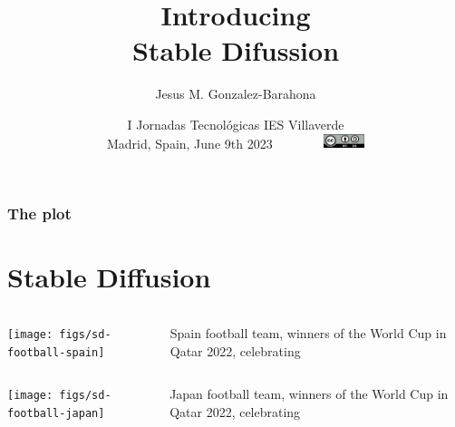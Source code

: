 \documentclass[17pt,aspectratio=169,hyperref={pdfusetitle,colorlinks,allcolors=olive}]{beamer}
\title[Stable Diffusion]{Introducing  \\ Stable Difussion}
\author[Jesus M. Gonzalez-Barahona]{Jesus M. Gonzalez-Barahona}
\institute[URJC]{Universidad Rey Juan Carlos \\
  \url{https://floss.social/@jgbarah} ~~~~~ \url{https://jgbarah.github.io/presentations}}
\date[Jornadas Cultura Libre, 2023]{\small I Jornadas Tecnológicas IES Villaverde \\
  Madrid, Spain, June 9th 2023~~~~~~~~\includegraphics[width=1.2cm]{figs/by-sa}}
\begin{document}
\begin{frame}
  \maketitle
\end{frame}



\begin{frame}
  \frametitle{The plot}
\tableofcontents
\end{frame}


\section{Stable Diffusion}

\begin{frame}[fragile]

    \begin{columns}[T]
    \begin{column}{.58\textwidth}
        \texttt{[image: figs/sd-football-spain]}
    \end{column}%
    \hfill%
    \begin{column}{.38\textwidth}
  Spain football team, winners of the World Cup in Qatar 2022, celebrating

    \end{column}%
  \end{columns}

\end{frame}

\begin{frame}[fragile]

    \begin{columns}[T]
    \begin{column}{.58\textwidth}
        \texttt{[image: figs/sd-football-japan]}
    \end{column}%
    \hfill%
    \begin{column}{.38\textwidth}
  Japan football team, winners of the World Cup in Qatar 2022, celebrating

    \end{column}%
  \end{columns}

\end{frame}
\end{document}
